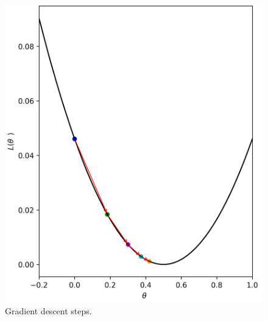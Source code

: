 \begin{figure}
  \centering
   \includegraphics[width=\linewidth]{Images/gradient-descent.png}
   \caption{Gradient descent steps.}
   \label{fig:gradient-descent}
\end{figure}
